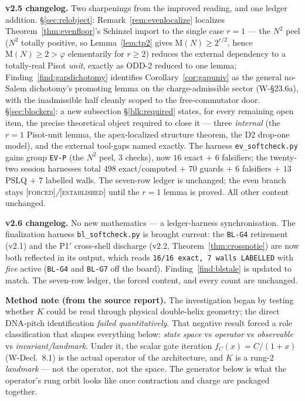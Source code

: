 \documentclass[11pt]{article}
\newcommand{\tagF}{\textcolor{cF}{\textsc{[forced]}}}
\newcommand{\tagE}{\textcolor{cE}{\textsc{[established]}}}
\newcommand{\hx}[1]{\textcolor{cC}{\footnotesize\texttt{#1}}}
\newcommand{\gp}{\varphi}
\newcommand{\M}{\mathrm{M}}
\theoremstyle{plain}
\theoremstyle{definition}
\theoremstyle{remark}
\begin{document}
\smallskip\noindent
\textbf{v2.5 changelog.} Two sharpenings from the improved reading, and one ledger
addition. \S\ref{sec:relobject}: Remark~\ref{rem:evenlocalize} localizes
Theorem~\ref{thm:evenfloor}'s Schinzel import to the single case $r=1$ --- the
$N^2$ peel ($N^2$ totally positive, so Lemma~\ref{lem:tp2} gives
$\M(N)\ge2^{r/2}$, hence $\M(N)\ge2>\gp$ elementarily for $r\ge2$) reduces the
external dependency to a totally-real Pisot \emph{unit}, exactly as ODD-2 reduced
to one lemma; Finding~\ref{find:gapdichotomy} identifies
Corollary~\ref{cor:gapuniv} as the general no-Salem dichotomy's promoting lemma on
the charge-admissible sector (W-\S23.6a), with the inadmissible half cleanly
scoped to the free-commutator door. \S\ref{sec:blockers}: a new subsection
\S\ref{blk:required} states, for every remaining open item, the precise
theoretical object required to close it --- three \emph{internal} (the $r=1$
Pisot-unit lemma, the apex-localized structure theorem, the D2 drop-one model),
and the external tool-gaps named exactly. The harness \texttt{ev\_softcheck.py}
gains group \hx{EV-P} (the $N^2$ peel, $3$ checks), now $16$ exact $+$ $6$
falsifiers; the twenty-two session harnesses total $498$ exact/computed $+$ $70$
guards $+$ $6$ falsifiers $+$ $13$ PSLQ $+$ $7$ labelled walls. The seven-row
ledger is unchanged; the even branch stays \tagF{}\emph{/}\tagE{} until the $r=1$
lemma is proved. All other content unchanged.

\smallskip\noindent
\textbf{v2.6 changelog.} No new mathematics --- a ledger-harness synchronisation.
The finalization harness \texttt{bl\_softcheck.py} is brought current: the
\hx{BL-G4} retirement (v2.1) and the P1$'$ cross-shell discharge (v2.2,
Theorem~\ref{thm:crossnotie}) are now both reflected in its output, which reads
\texttt{16/16 exact, 7 walls LABELLED} with \emph{five} active (\hx{BL-G4} and
\hx{BL-G7} off the board). Finding~\ref{find:blstale} is updated to match. The
seven-row ledger, the forced content, and every count are unchanged.

\smallskip\noindent
\textbf{Method note (from the source report).} The investigation began by
testing whether $K$ could be read through physical double-helix geometry; the
direct DNA-pitch identification \emph{failed quantitatively}. That negative
result forced a role classification that shapes everything below:
\emph{state space} vs \emph{operator} vs \emph{observable} vs
\emph{invariant/landmark}. Under it, the scalar gate iteration
$f_C(x)=C/(1+x)$ (W-Decl.\ 8.1) is the actual operator of the architecture,
and $K$ is a rung-2 \emph{landmark} --- not the operator, not the space. The
generator below is what the operator's rung orbit looks like once contraction
and charge are packaged together.
\end{document}
